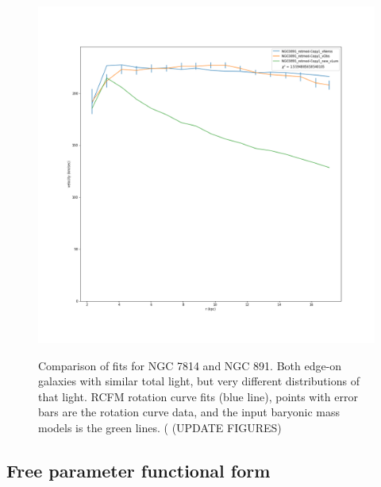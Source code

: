 \documentclass[reprint,%
 amsmath,amssymb,
 aps,
]{revtex4-1}
\begin{document}
\begin{figure}
\begin{minipage}{.5\textwidth}
  \includegraphics[width=.95\linewidth]{figures/NGC0891_rotmod-Copy1_XueSofue.png}
  \label{fig:test1}
\end{minipage}
 \caption{Comparison of fits for NGC 7814 and NGC 891. Both edge-on galaxies with similar total light, but very different distributions of that light.     RCFM rotation curve fits (blue line), points with error bars are the rotation curve data, and the input baryonic mass models is  the green lines. {\color{blue}( (UPDATE FIGURES) } }\label{fitCompare7814_891}
\end{figure}
 
 
 
 
  

\subsection{Free parameter functional form }\label{FreeCorrel}
\end{document}
